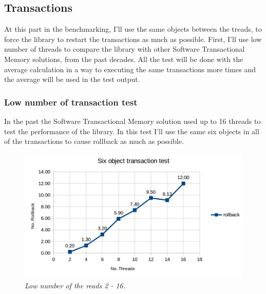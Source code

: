 \documentclass[12pt]{article}
\begin{document}
\newpage
\subsection{Transactions}
At this part in the benchmarking, I'll use the same objects between the treads, to force the library to restart the transactions as much as possible. First, I'll use low number of threads to compare the library with other Software Transactional Memory solutions, from the past decades. All the test will be done with the average calculation in a way to executing the same transactions more times and the average will be used in the test output.

\subsubsection{Low number of transaction test}
In the past the Software Transactional Memory solution used up to 16 threads to test the performance of the library. In this test I'll use the same six objects in all of the transactions to cause rollback as much as possible.

\begin{figure}[h!]
\centering
\includegraphics[scale=0.4]{Pictures/base_transaction.png}
\caption*{\textit{\color{gray}Low number of the reads 2 - 16.}}
\end{figure}
\end{document}

